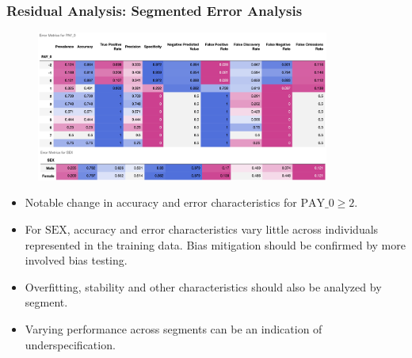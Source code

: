 \documentclass[11pt,
               aspectratio=169,
               hyperref={colorlinks}
               ]{beamer}
\begin{document}
			\begin{frame}[t]
		
				\frametitle{\textbf{Residual Analysis}: Segmented Error Analysis}
		
		        \vspace{-10pt}
				\begin{figure}
					\begin{center}
						\includegraphics[height=140pt]{../img/de.png}
					\end{center}
				\end{figure}
				\begin{itemize}\tiny
					\item Notable change in accuracy and error characteristics for $\text{PAY\_0} \geq 2$. 
					\item For $\text{SEX}$, accuracy and error characteristics vary little across individuals represented in the training data. Bias mitigation should be confirmed by more involved bias testing.
					\item Overfitting, stability and other characteristics should also be analyzed by segment.
					\item Varying performance across segments can be an indication of underspecification. 
				\end{itemize}
		
			\end{frame}
\end{document}
